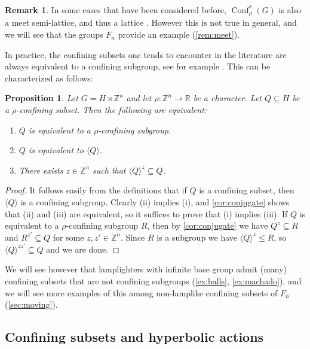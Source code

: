 \documentclass[reqno,12pt]{amsart}\setcounter{tocdepth}{1}
\newtheorem{proposition}[theorem]{Proposition}
\theoremstyle{definition}
\newtheorem{remark}[theorem]{Remark}
\newcommand{\Z}{\mathbb{Z}}
\newcommand{\R}{\mathbb{R}}
\DeclareMathOperator{\Conf}{Conf}
\numberwithin{equation}{section}
\begin{document}
\begin{remark}
In some cases that have been considered before, $\Conf^\ast_\rho(G)$ is also a meet semi-lattice, and thus a lattice \cite{sahana:wreath, AR:BS, ABR2}. However this is not true in general, and we will see that the groups $F_n$ provide an example (\cref{rem:meet}).
\end{remark}

In practice, the confining subsets one tends to encounter in the literature are always equivalent to a confining subgroup, see for example \cite{caprace15, sahana:wreath, AR:BS, ABR2}. This can be characterized as follows:

\begin{proposition}\label{prop:equiv_to_subgroup}
Let $G=H\rtimes \Z^n$ and let $\rho\colon \Z^n \to\R$ be a character. Let $Q\subseteq H$ be a $\rho$-confining subset. Then the following are equivalent:
\begin{enumerate}
    \item $Q$ is equivalent to a $\rho$-confining subgroup.
    \item $Q$ is equivalent to $\langle Q\rangle$.
    \item There exists $z\in \Z^n$ such that $\langle Q\rangle^z\subseteq Q$.
\end{enumerate}
\end{proposition}

\begin{proof}
It follows easily from the definitions that if $Q$ is a confining subset, then $\langle Q \rangle$ is a confining subgroup. Clearly (ii) implies (i), and \cref{cor:conjugate} shows that (ii) and (iii) are equivalent, so it suffices to prove that (i) implies (iii). If $Q$ is equivalent to a $\rho$-confining subgroup $R$, then by \cref{cor:conjugate} we have $Q^z\subseteq R$ and $R^{z'}\subseteq Q$ for some $z,z'\in\Z^n$. Since $R$ is a subgroup we have $\langle Q\rangle^z\le R$, so $\langle Q\rangle^{zz'}\subseteq Q$ and we are done.
\end{proof}

We will see however that lamplighters with infinite base group admit (many) confining subsets that are not confining subgroups (\cref{ex:balls}, \cref{ex:machado}), and we will see more examples of this among non-lamplike confining subsets of $F_n$ (\cref{sec:moving}).


\subsection{Confining subsets and hyperbolic actions}\label{ssec:conf_hyp}
\end{document}
